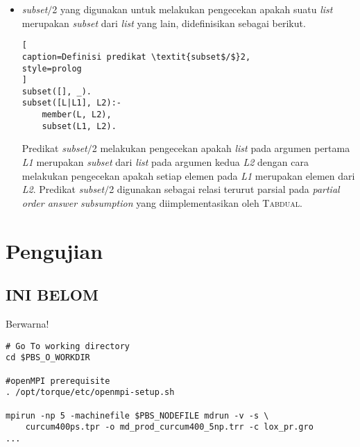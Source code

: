 \begin{itemize}
	Predikat \textit{get\_abducibles$/$}1 cukup melakukan unifikasi argumennya, \textit{A}, dengan \textit{list abducible} yang sudah tersimpan pada \textit{database}. Jika \textit{abducible} tidak ditemukan, maka \textit{get\_abducibles$/$}1 memberikan \textit{list} kosong.
	
	\item \label{subset} \textit{subset$/$}2 yang digunakan untuk melakukan pengecekan apakah suatu \textit{list} merupakan \textit{subset} dari \textit{list} yang lain, didefinisikan sebagai berikut.
	\\
	
\begin{lstlisting}[
caption=Definisi predikat \textit{subset$/$}2,
style=prolog
]
subset([], _).
subset([L|L1], L2):-
	member(L, L2),
	subset(L1, L2).
\end{lstlisting}
	
	Predikat \textit{subset$/$}2 melakukan pengecekan apakah \textit{list} pada argumen pertama \textit{L1} merupakan \textit{subset} dari \textit{list} pada argumen kedua \textit{L2} dengan cara melakukan pengecekan apakah setiap elemen pada \textit{L1} merupakan elemen dari \textit{L2}. Predikat \textit{subset$/$}2 digunakan sebagai relasi terurut parsial pada \textit{partial order answer subsumption} yang diimplementasikan oleh \textsc{Tabdual}.
	
\end{itemize}
\section{Pengujian} %

\subsection{INI BELOM}
Berwarna!
\begin{lstlisting}[caption=Potongan skrip submisi \f{job} melalui torqace,label={lst:grotorqace},style=shell]
# Go To working directory
cd $PBS_O_WORKDIR

#openMPI prerequisite
. /opt/torque/etc/openmpi-setup.sh

mpirun -np 5 -machinefile $PBS_NODEFILE mdrun -v -s \ 
	curcum400ps.tpr -o md_prod_curcum400_5np.trr -c lox_pr.gro
...
\end{lstlisting}
